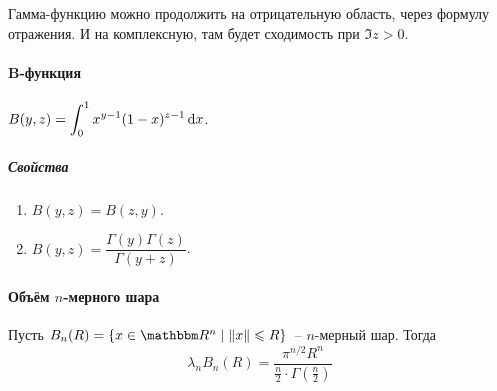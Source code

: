 \documentclass[draft, timbord]{longnotes}
\begin{document}
Гамма-функцию можно продолжить на отрицательную область, через формулу отражения.
И на комплексную, там будет сходимость при $\Im z > 0$.

\paragraph{B-функция}
\label{par:meas::beta}

\begin{defn}\label{defn:meas::beta}
  $\displaystyle B(y,z) = \int_0^1 x^{y-1} (1-x)^{z-1} \, \mathrm{d} x$.
\end{defn}

\subparagraph{Свойства}
\begin{enumerate}[$1^\circ$]
  \item $B(y,z) = B(z,y)$.
  \item $B(y,z) = \dfrac{\Gamma(y) \Gamma(z)}{\Gamma(y+z)}$.
\end{enumerate}

\paragraph{Объём \texorpdfstring{$n$}{n}-мерного шара}
\label{par:meas::ball}

\begin{thrm}\label{thrm:meas::ball}
  Пусть $B_n(R) = \{x \in \R^n \mid \|x\| \leqslant R \}$~-- $n$-мерный шар.
  Тогда 
  \[
    \lambda_n B_n(R) = \frac{\pi ^{n/2} R^n}{\tfrac{n}{2} \cdot \Gamma(\tfrac{n}{2})} 
  \]
\end{thrm}
\end{document}
